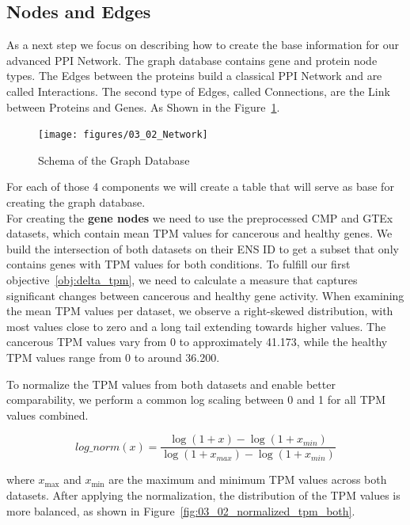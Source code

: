 \subsection{Nodes and Edges} \label{subsec:nodes_and_edges}

As a next step we focus on describing how to create the base information for our advanced PPI Network.
The graph database contains gene and protein node types.
The Edges between the proteins build a classical PPI Network and are called Interactions. %
The second type of Edges, called Connections, are the Link between Proteins and Genes.
As Shown in the Figure~\ref{fig:03_02_Network}.

\begin{figure}[h]
\centering
\texttt{[image: figures/03\_02\_Network]}
\caption{Schema of the Graph Database}
\label{fig:03_02_Network}
\end{figure}

For each of those 4 components we will create a table that will serve as base for creating the graph database.\\


For creating the \textbf{gene nodes} we need to use the preprocessed CMP and GTEx datasets,
which contain mean TPM values for cancerous and healthy genes.
We build the intersection of both datasets on their ENS ID to get a subset that only contains genes with TPM values for both conditions.
To fulfill our first objective~\ref{obj:delta_tpm},
we need to calculate a measure that captures significant changes between cancerous and healthy gene activity.
When examining the mean TPM values per dataset, we observe a right-skewed distribution, with most values close to zero
and a long tail extending towards higher values.
The cancerous TPM values vary from 0 to approximately 41.173, while the healthy TPM values range from 0 to around 36.200.



To normalize the TPM values from both datasets and enable better comparability, we perform a common log scaling between 0 and 1 for all TPM values combined.

\begin{equation}
\label{eq:tpm_normalization}
log\_norm(x) = \frac{\log(1 + x) - \log(1 + x_{min})}{\log(1 + x_{max}) - \log(1 + x_{min})}
\end{equation}

where $x_{\max}$ and $x_{\min}$ are the maximum and minimum TPM values across both datasets.
After applying the normalization, the distribution of the TPM values is more balanced, as shown in Figure~\ref{fig:03_02_normalized_tpm_both}.

